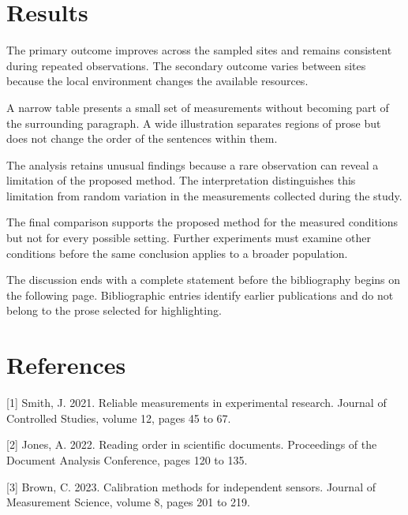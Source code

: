 \documentclass[10pt,twocolumn]{article}
\begin{document}
\section{Results}
The primary outcome improves across the sampled sites and remains consistent during repeated observations. The secondary outcome varies between sites because the local environment changes the available resources.


A narrow table presents a small set of measurements without becoming part of the surrounding paragraph. A wide illustration separates regions of prose but does not change the order of the sentences within them.


The analysis retains unusual findings because a rare observation can reveal a limitation of the proposed method. The interpretation distinguishes this limitation from random variation in the measurements collected during the study.


The final comparison supports the proposed method for the measured conditions but not for every possible setting. Further experiments must examine other conditions before the same conclusion applies to a broader population.


The discussion ends with a complete statement before the bibliography begins on the following page. Bibliographic entries identify earlier publications and do not belong to the prose selected for highlighting.


\clearpage
\nolinenumbers
\section*{References}
[1] Smith, J. 2021. Reliable measurements in experimental research. Journal of Controlled Studies, volume 12, pages 45 to 67.

[2] Jones, A. 2022. Reading order in scientific documents. Proceedings of the Document Analysis Conference, pages 120 to 135.

[3] Brown, C. 2023. Calibration methods for independent sensors. Journal of Measurement Science, volume 8, pages 201 to 219.
\end{document}
